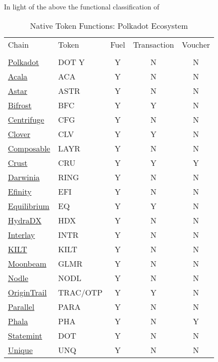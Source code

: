 \documentclass[11pt]{article}
\def \doturl{https://research.web3.foundation/en/latest/polkadot/overview/2-token-economics.html}
\def \acaurl{https://github.com/AcalaNetwork/Acala-white-paper/}
\def \astrurl{https://docs.astar.network/docs/about/token-economics/inflationary-model/}
\def \bfcurl{https://docs.thebifrost.io/bifrost-network/}
\def \cfgurl{https://docs.centrifuge.io/}
\def \clvurl{https://docs.clv.org/use-clv-chain/economics/tokenomics}
\def \layrurl{https://docs.composable.finance/parachains/composable/LAYR-tokenomics}
\def \cruurl{https://crustipfs.live/ipfs/QmXUhqUgZGVJsWmV4TCDePwWtpJvEAx7rvNCjuNKaEUHzk}
\def \ringurl{https://darwinia.network/genepaper_v2.pdf}
\def \efiurl{https://efinity.io/whitepaper/introduction}
\def \equrl{https://equilibrium.io/docs/EQ_token_economy.pdf}
\def \hdxurl{https://docs.hydradx.io/tokenomics/}
\def \intrurl{https://docs.interlay.io/\#/interlay/tokenomics/}
\def \kilturl{https://www.kilt.io/wp-content/uploads/2021/08/19_KILT_Token_Metrics_Revised_Version.pdf}
\def \glmrurl{https://moonbeam.foundation/glimmer-token/}
\def \nodlurl{https://docs.nodle.com/docs/tokenomics/introduction}
\def \tracotpurl{https://parachain.origintrail.io/whitepaper?section=trac-otp-tokenomics}
\def \paraurl{https://docs.parallel.fi/parallel-finance/parallel-finance-protocol/parallel-token-economy-paper}
\def \phaurl{https://wiki.phala.network/en-us/general/phala-network/intro/}
\def \dotsurl{https://wiki.polkadot.network/docs/learn-statemint}
\def \unqurl{https://github.com/UniqueNetwork/techpaper/blob/master/unique_techpaper.pdf}
\begin{document}
In light of the above the functional classification of 
\begin{table}[!ht]
\caption{Native Token Functions: Polkadot Ecosystem} %
\centering %
\begin{tabular}{l l c c c} %
\hline\hline %
Chain & Token & Fuel & Transaction & Voucher \\ [0.5ex]
\\ [0.5ex]
\hline %

\rule{0pt}{1.5\normalbaselineskip}\href{\doturl}{Polkadot}     & DOT Y & Y & N & N \\
\href{\acaurl}{Acala}        & ACA   & Y & N & N \\
\href{\astrurl}{Astar}       & ASTR  & Y & N & N \\
\href{\bfcurl}{Bifrost}      & BFC   & Y & Y & N \\
\href{\cfgurl}{Centrifuge}   & CFG   & Y & N & N \\
\href{\clvurl}{Clover}       & CLV   & Y & Y & N \\
\href{\layrurl}{Composable}  & LAYR  & Y & N & N \\
\href{\cruurl}{Crust}        & CRU   & Y & Y & Y \\ 
\href{\ringurl}{Darwinia}    & RING  & Y & N & N \\ 
\href{\efiurl}{Efinity}      & EFI   & Y & N & N \\
\href{\equrl}{Equilibrium}   & EQ    & Y & Y & N \\
\href{\hdxurl}{HydraDX}      & HDX   & Y & N & N \\
\href{\intrurl}{Interlay}    & INTR  & Y & N & N \\
\href{\kilturl}{KILT}        & KILT  & Y & N & N \\
\href{\glmrurl}{Moonbeam}    & GLMR  & Y & N & N \\
\href{\nodlurl}{Nodle}       & NODL  & Y & N & N \\
\href{\tracotpurl}{OriginTrail} & TRAC/OTP  & Y & Y & N \\
\href{\paraurl}{Parallel}       & PARA      & Y & N & N \\
\href{\phaurl}{Phala}           & PHA       & Y & N & Y \\
\href{\dotsurl}{Statemint}      & DOT       & Y & N & N \\
\href{\unqurl}{Unique}          & UNQ       & Y & N & N \\[1.5ex]
\hline %

\end{tabular}
\end{table}
\end{document}
